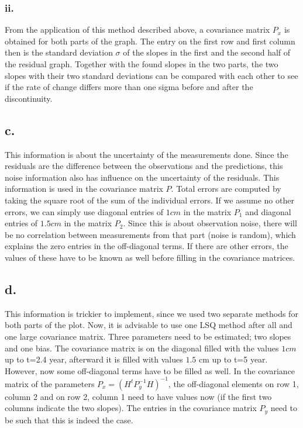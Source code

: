 \documentclass[a4paper,10pt,titlepage]{article}
\begin{document}
\subsubsection*{ii.}
From the application of this method described above, a covariance matrix $P_x$ is obtained for both parts of the graph. The entry on the first row and first column then is the standard deviation $\sigma$ of the slopes in the first and the second half of the residual graph. Together with the found slopes in the two parts, the two slopes with their two standard deviations can be compared with each other to see if the rate of change differs more than one sigma before and after the discontinuity.
\subsection*{c.}
This information is about the uncertainty of the measurements done. Since the residuals are the difference between the observations and the predictions, this noise information also has influence on the uncertainty of the residuals. This information is used in the covariance matrix $P$. Total errors are computed by taking the square root of the sum of the individual errors. If we assume no other errors, we can simply use diagonal entries of $1 cm$ in the matrix $P_1$ and diagonal entries of $1.5 cm$ in the matrix $P_2$. Since this is about observation noise, there will be no correlation between measurements from that part (noise is random), which explains the zero entries in the off-diagonal terms. If there are other errors, the values of these have to be known as well before filling in the covariance matrices.
\subsection*{d.}
This information is trickier to implement, since we used two separate methods for both parts of the plot. Now, it is advisable to use one LSQ method after all and one large covariance matrix. Three parameters need to be estimated; two slopes and one bias. The covariance matrix is on the diagonal filled with the values $1 cm$ up to t=2.4 year, afterward it is filled with values $1.5$ cm up to t=5 year. However, now some off-diagonal terms have to be filled as well. In the covariance matrix of the parameters $P_x = (H^t P_y^{-1} H)^{-1}$, the off-diagonal elements on row 1, column 2 and on row 2, column 1 need to have values now (if the first two columns indicate the two slopes). The entries in the covariance matrix $P_y$ need to be such that this is indeed the case.
\end{document}
